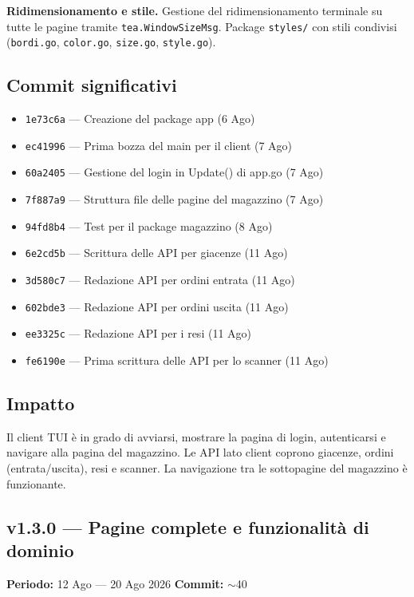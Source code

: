 \documentclass[a4paper,12pt]{article}
\begin{document}
\textbf{Ridimensionamento e stile.}
Gestione del ridimensionamento terminale su tutte le pagine tramite \texttt{tea.WindowSizeMsg}. Package \texttt{styles/} con stili condivisi (\texttt{bordi.go}, \texttt{color.go}, \texttt{size.go}, \texttt{style.go}).

\subsection*{Commit significativi}
\begin{itemize}
    \item \texttt{1e73c6a} --- Creazione del package app (6 Ago)
    \item \texttt{ec41996} --- Prima bozza del main per il client (7 Ago)
    \item \texttt{60a2405} --- Gestione del login in Update() di app.go (7 Ago)
    \item \texttt{7f887a9} --- Struttura file delle pagine del magazzino (7 Ago)
    \item \texttt{94fd8b4} --- Test per il package magazzino (8 Ago)
    \item \texttt{6e2cd5b} --- Scrittura delle API per giacenze (11 Ago)
    \item \texttt{3d580c7} --- Redazione API per ordini entrata (11 Ago)
    \item \texttt{602bde3} --- Redazione API per ordini uscita (11 Ago)
    \item \texttt{ee3325c} --- Redazione API per i resi (11 Ago)
    \item \texttt{fe6190e} --- Prima scrittura delle API per lo scanner (11 Ago)
\end{itemize}

\subsection*{Impatto}
Il client TUI \`{e} in grado di avviarsi, mostrare la pagina di login, autenticarsi e navigare alla pagina del magazzino. Le API lato client coprono giacenze, ordini (entrata/uscita), resi e scanner. La navigazione tra le sottopagine del magazzino \`{e} funzionante.

\newpage

\begin{decisionbox}
\section*{v1.3.0 --- Pagine complete e funzionalit\`{a} di dominio}
\textbf{Periodo:} 12 Ago --- 20 Ago 2026 \hfill \textbf{Commit:} $\sim$40
\end{decisionbox}
\end{document}
